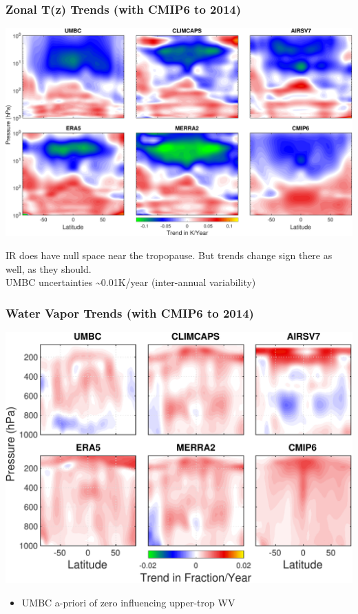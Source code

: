 \documentclass[10pt,t]{beamer}
\begin{document}
\begin{frame}
\frametitle{Zonal T(z) Trends (with CMIP6 to 2014)}  
\vspace{-0.15in}
\begin{center}
\includegraphics[width=\linewidth]{SunClimate2022/zonal_trates_1to1000mbar_cmip6_newcaxis.pdf}
\end{center}

\footnotesize
IR does have null space near the tropopause.  But trends change sign there as well, as they should.\\
\vspace{0.1in}
UMBC uncertainties \textasciitilde{}0.01K/year (inter-annual variability)
\end{frame}
\begin{frame}
\frametitle{Water Vapor Trends (with CMIP6 to 2014)}  
\vspace{-0.15in}
\begin{center}
\includegraphics[width=0.85\linewidth]{./Figslls/tiled_all_N_WV_trend_without_mls_start_with_cmip6.pdf}
\end{center}




\small
\begin{itemize}
\item UMBC a-priori of zero influencing upper-trop WV
\end{itemize}
\end{frame}
\end{document}
